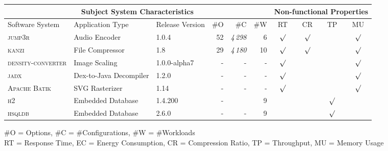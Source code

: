 \begin{tabular}{lllrrr|cccc}
		\toprule
		\multicolumn{6}{c}{\textbf{Subject System Characteristics}} & \multicolumn{4}{c}{\textbf{Non-functional Properties}}\\
		\midrule
		Software System &  Application Type & Release Version & \#O & \#C & \#W & RT & CR & TP & MU \\
		\midrule
		\rowcolor{MidnightBlue!0}
		\textsc{jump3r} & Audio Encoder & 1.0.4 & 52 & \textit{4\,298} & 6 & $\surd$ & $\surd$ &  & $\surd$\\
		
		\rowcolor{MidnightBlue!0}	
		\textsc{kanzi} & File Compressor & 1.8 & 29 & \textit{4\,180} & 10 & $\surd$ & $\surd$ &  & $\surd$ \\
		
		\rowcolor{MidnightBlue!0}
		\textsc{density-converter} & Image Scaling & 1.0.0-alpha7 & - & - & - & $\surd$  &  &  & $\surd$ \\
		
		\rowcolor{MidnightBlue!0}
		\textsc{jadx} & Dex-to-Java Decompiler & 1.2.0 & - & - & - & $\surd$ &  &  & $\surd$ \\
		
		\rowcolor{MidnightBlue!0}
		\textsc{Apache Batik} & SVG Rasterizer & 1.14 & - & - &  - & $\surd$ &   &  & $\surd$ \\
		
		\rowcolor{MidnightBlue!0}	
		\textsc{h2} & Embedded Database & 1.4.200 & - &  & 9 &   &  & $\surd$ & \\
		
		\rowcolor{MidnightBlue!0}
		\textsc{hsqldb} & Embedded Database & 2.6.0 & - & - & 9  &  &  & $\surd$ & \\
		
		
		\bottomrule
	\end{tabular}
	{\vspace{1mm}\#O = Options, \#C = \#Configurations, \#W = \#Workloads}\\
	{RT = Response Time, EC = Energy Consumption, CR = Compression Ratio, TP = Throughput, MU = Memory Usage}
	\vspace{0.1cm}
